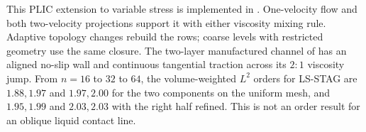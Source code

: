 This PLIC extension to variable stress is implemented in
.
One-velocity flow and both two-velocity projections support it with either
viscosity mixing rule. Adaptive topology changes rebuild the rows; coarse
levels with restricted geometry use the same closure.
The two-layer manufactured channel of
has an aligned no-slip wall and continuous tangential traction across its
$2:1$ viscosity jump. From $n=16$ to $32$ to $64$, the volume-weighted
$L^2$ orders for LS-STAG are $1.88,1.97$ and $1.97,2.00$ for the two
components on the uniform mesh, and $1.95,1.99$ and $2.03,2.03$ with
the right half refined. This is not an order result for an oblique liquid
contact line.

